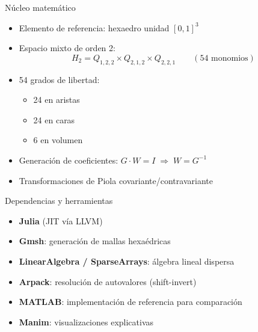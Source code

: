 \documentclass[aspectratio=169,11pt]{beamer}
\begin{document}
\begin{frame}{Núcleo matemático}
  \begin{itemize}
    \item Elemento de referencia: hexaedro unidad $[0,1]^3$
    \item Espacio mixto de orden 2:
      \begin{equation*}
        H_2 = Q_{1,2,2} \times Q_{2,1,2} \times Q_{2,2,1}
        \qquad (54 \text{ monomios})
      \end{equation*}
    \item 54 grados de libertad:
      \begin{itemize}
        \item 24 en aristas
        \item 24 en caras
        \item 6 en volumen
      \end{itemize}
    \item Generación de coeficientes: $G \cdot W = I \;\Rightarrow\; W = G^{-1}$
    \item Transformaciones de Piola covariante/contravariante
  \end{itemize}
\end{frame}

\begin{frame}{Dependencias y herramientas}
  \begin{itemize}
    \item \textbf{Julia} (JIT vía LLVM)
    \item \textbf{Gmsh}: generación de mallas hexaédricas
    \item \textbf{LinearAlgebra / SparseArrays}: álgebra lineal dispersa
    \item \textbf{Arpack}: resolución de autovalores (shift-invert)
    \item \textbf{MATLAB}: implementación de referencia para comparación
    \item \textbf{Manim}: visualizaciones explicativas
  \end{itemize}
\end{frame}
\end{document}
